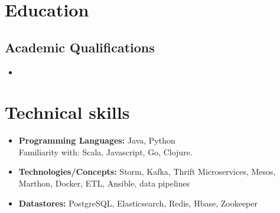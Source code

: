 \documentclass[11pt,a4paper,sans]{moderncv}        %
\begin{document}
\section{Education}

\vspace{5pt}

\subsection{Academic Qualifications}

\vspace{5pt}

\begin{itemize}

\item{}

\end{itemize}

\vspace{2pt}

\section{Technical skills}

\vspace{6pt}

\begin{itemize}

\item \textbf{Programming Languages:} Java, Python 
\\ Familiarity with: Scala, Javascript, Go, Clojure.

\vspace{6pt}

\item \textbf{Technologies/Concepts:} Storm, Kafka, Thrift Microservices, Mesos, Marthon, Docker, ETL, Ansible, data pipelines 

\vspace{6pt}

\item \textbf{Datastores:} PostgreSQL, Elasticsearch, Redis, Hbase, Zookeeper

\vspace{6pt}

\end{itemize}


\end{document}
